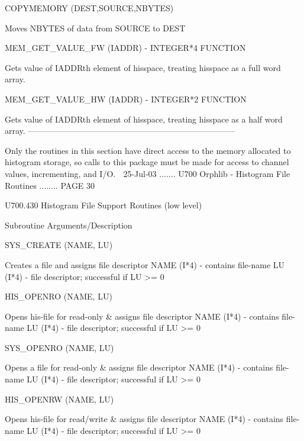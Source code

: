    COPYMEMORY        (DEST,SOURCE,NBYTES)
 
                      Moves NBYTES of data from SOURCE to DEST
 
   MEM_GET_VALUE_FW  (IADDR)  -  INTEGER*4 FUNCTION
 
                      Gets value of IADDRth element of hisspace,
                      treating hisspace as a full word array.
 
   MEM_GET_VALUE_HW  (IADDR)  -  INTEGER*2 FUNCTION
 
                      Gets value of IADDRth element of hisspace,
                      treating hisspace as a half word array.
   ---------------------------------------------------------------------------
 
   Only the routines  in  this  section  have  direct  access  to  the  memory
   allocated  to  histogram storage, so calls to this package must be made for
   access to channel values, incrementing, and I/O.
    
   25-Jul-03 ....... U700  Orphlib - Histogram File Routines ........ PAGE  30
 
 
   U700.430  Histogram File Support Routines (low level)
 
   Subroutine          Arguments/Description
 
   SYS_CREATE         (NAME, LU)
 
                       Creates a file and assigns file descriptor
                       NAME (I*4) - contains file-name
                       LU   (I*4) - file descriptor; successful if LU >= 0
 
   HIS_OPENRO         (NAME, LU)
 
                       Opens his-file for read-only & assigns file descriptor
                       NAME (I*4) - contains file-name
                       LU   (I*4) - file descriptor; successful if LU >= 0
 
   SYS_OPENRO         (NAME, LU)
 
                       Opens a file for read-only & assigns file descriptor
                       NAME (I*4) - contains file-name
                       LU   (I*4) - file descriptor; successful if LU >= 0
 
   HIS_OPENRW         (NAME, LU)
 
                       Opens his-file for read/write & assigns file descriptor
                       NAME (I*4) - contains file-name
                       LU   (I*4) - file descriptor; successful if LU >= 0
 
